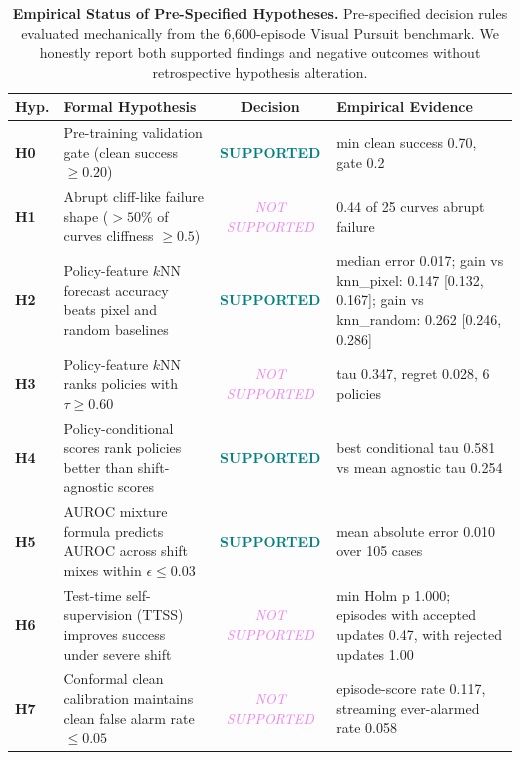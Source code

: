\begin{table}[t]
\centering
\small
\caption{\textbf{Empirical Status of Pre-Specified Hypotheses.} Pre-specified decision rules evaluated mechanically from the 6,600-episode Visual Pursuit benchmark. We honestly report both supported findings and negative outcomes without retrospective hypothesis alteration.}
\label{tab:hypotheses}
\begin{tabular}{lp{6.5cm}cp{5.5cm}}
\toprule
\textbf{Hyp.} & \textbf{Formal Hypothesis} & \textbf{Decision} & \textbf{Empirical Evidence} \\
\midrule
\textbf{H0} & Pre-training validation gate (clean success $\ge 0.20$) & \textcolor{teal}{\textbf{SUPPORTED}} & min clean success 0.70, gate 0.2 \\
\textbf{H1} & Abrupt cliff-like failure shape ($>50\%$ of curves cliffness $\ge 0.5$) & \textcolor{violet}{\textit{NOT SUPPORTED}} & 0.44 of 25 curves abrupt failure \\
\textbf{H2} & Policy-feature $k$NN forecast accuracy beats pixel and random baselines & \textcolor{teal}{\textbf{SUPPORTED}} & median error 0.017; gain vs knn\_pixel: 0.147 [0.132, 0.167]; gain vs knn\_random: 0.262 [0.246, 0.286] \\
\textbf{H3} & Policy-feature $k$NN ranks policies with $\tau \ge 0.60$ & \textcolor{violet}{\textit{NOT SUPPORTED}} & tau 0.347, regret 0.028, 6 policies \\
\textbf{H4} & Policy-conditional scores rank policies better than shift-agnostic scores & \textcolor{teal}{\textbf{SUPPORTED}} & best conditional tau 0.581 vs mean agnostic tau 0.254 \\
\textbf{H5} & AUROC mixture formula predicts AUROC across shift mixes within $\epsilon \le 0.03$ & \textcolor{teal}{\textbf{SUPPORTED}} & mean absolute error 0.010 over 105 cases \\
\textbf{H6} & Test-time self-supervision (TTSS) improves success under severe shift & \textcolor{violet}{\textit{NOT SUPPORTED}} & min Holm p 1.000; episodes with accepted updates 0.47, with rejected updates 1.00 \\
\textbf{H7} & Conformal clean calibration maintains clean false alarm rate $\le 0.05$ & \textcolor{violet}{\textit{NOT SUPPORTED}} & episode-score rate 0.117, streaming ever-alarmed rate 0.058 \\
\bottomrule
\end{tabular}
\end{table}

